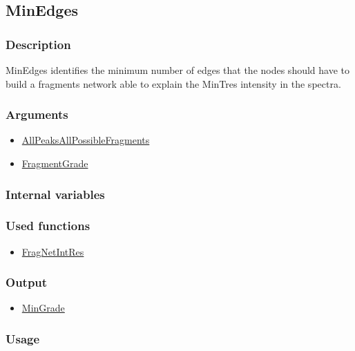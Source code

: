 \subsection{MinEdges}\label{MinEdges}
\subsubsection{Description}
MinEdges identifies the minimum number of edges that the nodes should have to build a fragments network able to explain the MinTres intensity in the spectra.
\subsubsection{Arguments}
\begin{itemize}
\item \hyperref[AllPeaksAllPossibleFragments]{AllPeaksAllPossibleFragments}
\item \hyperref[FragmentGrade]{FragmentGrade}
\end{itemize}
\subsubsection{Internal variables}
\subsubsection{Used functions}
\begin{itemize}
\item \hyperref[FragNetIntRes]{FragNetIntRes}
\end{itemize}
\subsubsection{Output}
\begin{itemize}
\item \hyperref[MinGrade]{MinGrade}
\end{itemize}
\subsubsection{Usage}

